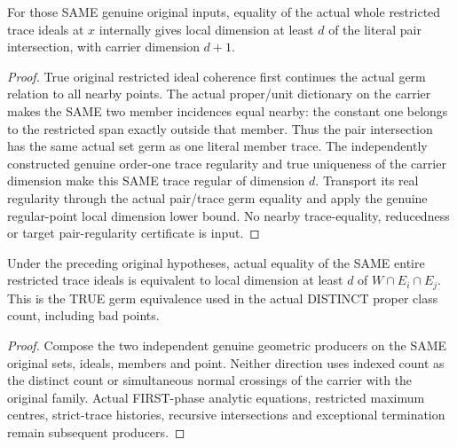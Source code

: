 \begin{theorem}
\label{hir:sharp-original-trace-ideal-equality-gives-pair-dimension}
\leanok
For those SAME genuine original inputs, equality of the actual whole restricted
trace ideals at $x$ internally gives local dimension at least $d$ of the
literal pair intersection, with carrier dimension $d+1$.
\end{theorem}
\begin{proof}
True original restricted ideal coherence first continues the actual germ
relation to all nearby points. The actual proper/unit dictionary on the
carrier makes the SAME two member incidences equal nearby: the constant one
belongs to the restricted span exactly outside that member. Thus the pair
intersection has the same actual set germ as one literal member trace.
The independently constructed genuine order-one trace regularity and true
uniqueness of the carrier dimension make this SAME trace regular of dimension
$d$. Transport its real regularity through the actual pair/trace germ equality
and apply the genuine regular-point local dimension lower bound. No nearby
trace-equality, reducedness or target pair-regularity certificate is input.
\end{proof}

\begin{theorem}
\label{hir:sharp-original-shared-order-one-trace-branch-dimension-iff}
\leanok
Under the preceding original hypotheses, actual equality of the SAME entire
restricted trace ideals is equivalent to local dimension at least $d$ of
$W\cap E_i\cap E_j$. This is the TRUE germ equivalence used in the actual
DISTINCT proper class count, including bad points.
\end{theorem}
\begin{proof}
Compose the two independent genuine geometric producers on the SAME original
sets, ideals, members and point. Neither direction uses indexed count as the
distinct count or simultaneous normal crossings of the carrier with the
original family. Actual FIRST-phase analytic equations, restricted maximum
centres, strict-trace histories, recursive intersections and exceptional
termination remain subsequent producers.
\end{proof}
